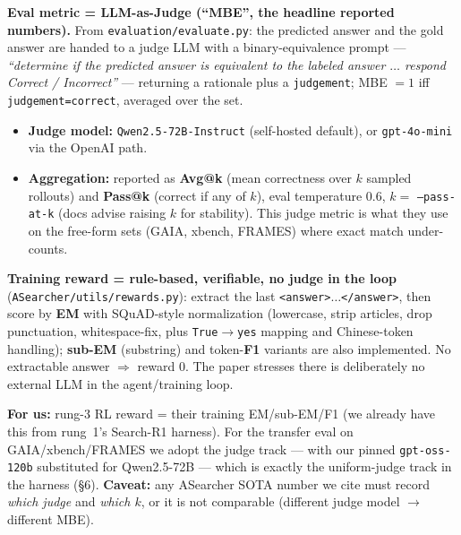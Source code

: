 \documentclass[10pt]{article}
\newcommand{\cmd}[1]{\texttt{\small #1}}
\begin{document}
\smallskip
\noindent\textbf{Eval metric = LLM-as-Judge (``MBE'', the headline reported numbers).} From
\cmd{evaluation/evaluate.py}: the predicted answer and the gold answer are handed to a judge LLM with a
binary-equivalence prompt --- \emph{``determine if the predicted answer is equivalent to the labeled
answer $\ldots$ respond Correct / Incorrect''} --- returning a rationale plus a \cmd{judgement}; MBE $=1$
iff \cmd{judgement=correct}, averaged over the set.
\begin{itemize}
\item \textbf{Judge model:} \cmd{Qwen2.5-72B-Instruct} (self-hosted default), or \cmd{gpt-4o-mini} via
the OpenAI path.
\item \textbf{Aggregation:} reported as \textbf{Avg@k} (mean correctness over $k$ sampled rollouts) and
\textbf{Pass@k} (correct if any of $k$), eval temperature 0.6, $k=$ \cmd{--pass-at-k} (docs advise raising
$k$ for stability). This judge metric is what they use on the free-form sets (GAIA, xbench, FRAMES) where
exact match under-counts.
\end{itemize}

\noindent\textbf{Training reward = rule-based, verifiable, no judge in the loop} (\cmd{ASearcher/utils/rewards.py}):
extract the last \cmd{<answer>$\ldots$</answer>}, then score by \textbf{EM} with SQuAD-style normalization
(lowercase, strip articles, drop punctuation, whitespace-fix, plus \cmd{True}$\to$\cmd{yes} mapping and
Chinese-token handling); \textbf{sub-EM} (substring) and token-\textbf{F1} variants are also implemented.
No extractable answer $\Rightarrow$ reward 0. The paper stresses there is deliberately no external LLM in
the agent/training loop.

\smallskip
\noindent\textbf{For us:} rung-3 RL reward = their training EM/sub-EM/F1 (we already have this from
rung~1's Search-R1 harness). For the transfer eval on GAIA/xbench/FRAMES we adopt the judge track ---
with our pinned \cmd{gpt-oss-120b} substituted for Qwen2.5-72B --- which is exactly the uniform-judge track
in the harness (§6). \textbf{Caveat:} any ASearcher SOTA number we cite must record \emph{which judge} and
\emph{which $k$}, or it is not comparable (different judge model $\to$ different MBE).
\end{document}
